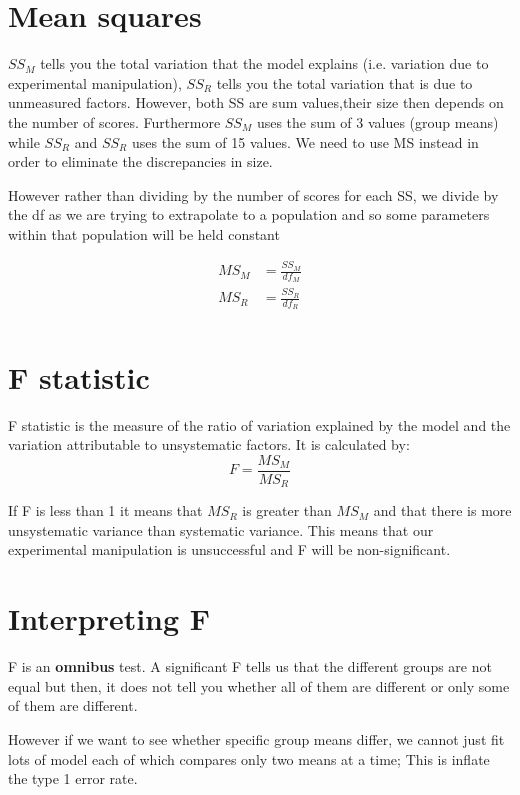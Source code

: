 \section{Mean squares}
$SS_M$ tells you the total variation that the model explains (i.e. variation due to experimental manipulation), $SS_R$ tells you the total variation that is due to unmeasured factors. However, both SS are sum values,their size then depends on the number of scores. Furthermore $SS_M$ uses the sum of 3 values (group means) while $SS_R$ and $SS_R$ uses the sum of 15 values. We need to use MS instead in order to eliminate the discrepancies in size. 

However rather than dividing by the number of scores for each SS, we divide by the df as we are trying to extrapolate to a population and so some parameters within that population will be held constant

\begin{equation}
\begin{split}
MS_M & = \frac{SS_M}{df_M} \\
MS_R & = \frac{SS_R}{df_R} \\
\end{split}
\end{equation}

\section{F statistic}
F statistic is the measure of the ratio of variation explained by the model and the variation attributable to unsystematic factors. 
It is calculated by:
\begin{equation}
F = \frac{MS_M}{MS_R}
\end{equation}

If F is less than 1 it means that $MS_R$ is greater than $MS_M$ and that there is more unsystematic variance than systematic variance. This means that our experimental manipulation is unsuccessful and F will be non-significant.

\section{Interpreting F}
F is an \textbf{omnibus} test. A significant F tells us that the different groups are not equal but then, it does not tell you whether all of them are different or only some of them are different.

However if we want to see whether specific group means differ, we cannot just fit lots of model each of which compares only two means at a time; This is inflate the type 1 error rate. 

